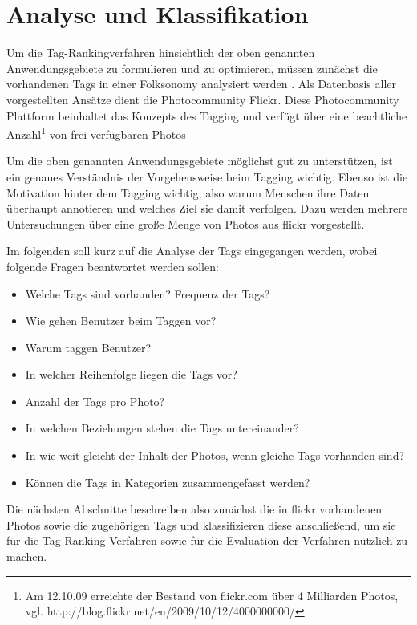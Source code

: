\section{Analyse und Klassifikation} %
\label{sec:analyse_und_klassifikation}

Um die Tag-Rankingverfahren hinsichtlich der oben genannten Anwendungsgebiete zu formulieren und zu optimieren, müssen zunächst die vorhandenen Tags in einer Folksonomy analysiert werden \cite{collectiveKnowledge}. Als Datenbasis aller vorgestellten Ansätze dient die Photocommunity Flickr. Diese Photocommunity Plattform beinhaltet das Konzepts des Tagging und verfügt über eine beachtliche Anzahl\footnote{Am 12.10.09 erreichte der Bestand von flickr.com über 4 Milliarden Photos, vgl. http://blog.flickr.net/en/2009/10/12/4000000000/ } von frei verfügbaren Photos


Um die oben genannten Anwendungsgebiete möglichst gut zu unterstützen, ist ein genaues Verständnis der Vorgehensweise beim Tagging wichtig. Ebenso ist die Motivation hinter dem Tagging wichtig, also warum Menschen ihre Daten überhaupt annotieren und welches Ziel sie damit verfolgen. Dazu werden mehrere Untersuchungen über eine große Menge von Photos aus flickr vorgestellt.

Im folgenden soll kurz auf die Analyse der Tags eingegangen werden, wobei folgende Fragen beantwortet werden sollen:
\begin{itemize}
	\item     Welche Tags sind vorhanden? Frequenz der Tags?
	\item     Wie gehen Benutzer beim Taggen vor?
	\item     Warum taggen Benutzer?
	\item     In welcher Reihenfolge liegen die Tags vor?
  \item     Anzahl der Tags pro Photo?
	\item     In welchen Beziehungen stehen die Tags untereinander?
	\item     In wie weit gleicht der Inhalt der Photos, wenn gleiche Tags vorhanden sind?
	\item     Können die Tags in Kategorien zusammengefasst werden?
\end{itemize}

Die nächsten Abschnitte beschreiben also zunächst die in flickr vorhandenen Photos sowie die zugehörigen Tags und klassifizieren diese anschließend, um sie für die Tag Ranking Verfahren sowie für die Evaluation der Verfahren nützlich zu machen.

